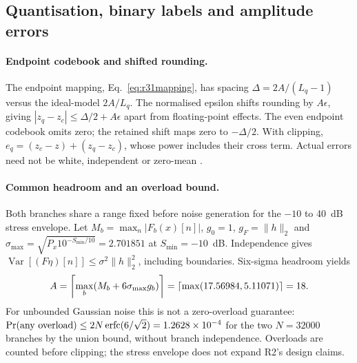 \subsection{Quantisation, binary labels and amplitude errors}
\label{app:quant}
\paragraph{Endpoint codebook and shifted rounding.}
The endpoint mapping, Eq.~\eqref{eq:r31mapping}, has spacing
$\Delta=2A/(L_q-1)$ versus the ideal-model $2A/L_q$. The normalised epsilon
shifts rounding by $A\epsilon$, giving $|z_q-z_c|\le\Delta/2+A\epsilon$
apart from floating-point effects. The even endpoint codebook omits zero;
the retained shift maps zero to $-\Delta/2$. With clipping,
$e_q=(z_c-z)+(z_q-z_c)$, whose power includes their cross term.
Actual errors need not be white, independent or zero-mean
\citep{widrow1996quantization}.

\paragraph{Common headroom and an overload bound.}
Both branches share a range fixed before noise generation for the
$-10$ to 40~dB stress envelope. Let $M_b=\max_n|F_b(x)[n]|$,
$g_0=1$, $g_F=\|h\|_2$ and
$\sigma_{\max}=\sqrt{P_x10^{-S_{\min}/10}}=2.701851$ at $S_{\min}=-10$~dB.
Independence gives $\operatorname{Var}[(F\eta)[n]]
\le\sigma^2\|h\|_2^2$, including boundaries. Six-sigma headroom yields
\begin{equation}
 A=\left\lceil\max_b(M_b+6\sigma_{\max}g_b)\right\rceil
 =\left\lceil\max(17.56984,5.11071)\right\rceil=18.
 \label{eq:r31range}
\end{equation}
For unbounded Gaussian noise this is not a zero-overload guarantee:
$\Pr(\text{any overload})\le2N\operatorname{erfc}(6/\sqrt2)=1.2628\times10^{-4}$
for the two $N=32000$ branches by the union bound, without branch
independence. Overloads are counted before clipping; the stress envelope
does not expand R2's design claims.

